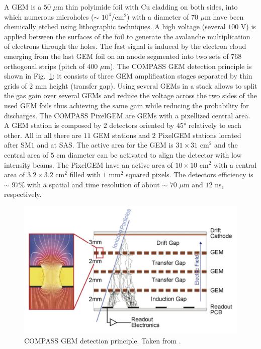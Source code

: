 A GEM is a $50$ $\mu$m thin polyimide foil with Cu cladding on both sides, into which numerous microholes ($\sim$ $10^4$/cm$^2$) with a diameter of $70$ $\mu$m have been chemically etched using lithographic techniques. A high voltage (several $100$ V) is applied between the surfaces of the foil to generate the avalanche multiplication of electrons through the holes. The fast signal is induced by the electron cloud emerging from the last GEM foil on an anode segmented into two sets of $768$ orthogonal strips (pitch of $400$ $\mu$m). The COMPASS GEM detection principle is shown in Fig.~\ref{pic:GEM}: it consists of three GEM amplification stages separated by thin grids of $2$ mm height (transfer gap). Using several GEMs in a stack allows to split the gas gain over several GEMs and reduce the voltage across the two sides of the used GEM foils thus achieving the same gain while reducing the probability for discharges. The COMPASS PixelGEM are GEMs with a pixellized central area. A GEM station is composed by $2$ detectors oriented by $45$° relatively to each other. All in all there are $11$ GEM stations and $2$ PixelGEM stations located after SM$1$ and at SAS. The active area for the GEM is $31 \times 31$ cm$^2$ and the central area of $5$ cm diameter can be activated to align the detector with low intensity beams. The PixelGEM have an active area of $10 \times 10$ cm$^2$ with a central area of $3.2 \times 3.2$ cm$^2$ filled with $1$ mm$^2$ squared pixels. The detectors efficiency is $\sim$ $97$\% with a spatial and time resolution of about $\sim$ $70$ $\mu$m and $12$ ns, respectively.

\begin{figure}[!h]
  \centering
	\includegraphics[scale=0.5]{./gfx/GEM.png}
	\caption{COMPASS GEM detection principle. Taken from \cite{NIM}.}
	\label{pic:GEM}
\end{figure}

